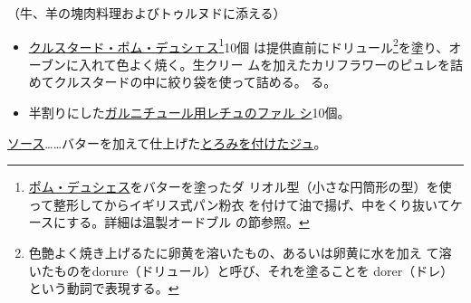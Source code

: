 \begin{recette}


（牛、羊の塊肉料理およびトゥルヌドに添える）

\begin{itemize}
\item
  \protect\hyperlink{croustade-en-pomme-duchesse}{クルスタード・ポム・デュシェス}\footnote{\protect\hyperlink{pomme-de-terre-duchesse}{ポム・デュシェス}をバターを塗ったダ
    リオル型（小さな円筒形の型）を使って整形してからイギリス式パン粉衣
    を付けて油で揚げ、中をくり抜いてケースにする。詳細は温製オードブル
    の節参照。}10個 は提供直前にドリュール\footnote{色艶よく焼き上げるたに卵黄を溶いたもの、あるいは卵黄に水を加え
    て溶いたものをdorure（ドリュール）と呼び、それを塗ることを
    dorer（ドレ）という動詞で表現する。}を塗り、オーブンに入れて色よく焼く。生クリー
  ムを加えたカリフラワーのピュレを詰めてクルスタードの中に絞り袋を使って詰める。
  る。
\item
  半割りにした\protect\hyperlink{laitues-farcies-pour-garniture}{ガルニチュール用レチュのファル
  シ}10個。
\end{itemize}

\ul{ソース}\ldots{}\ldots{}バターを加えて仕上げた\protect\hyperlink{jus-de-veau-lie}{とろみを付けたジュ}。
\end{recette}